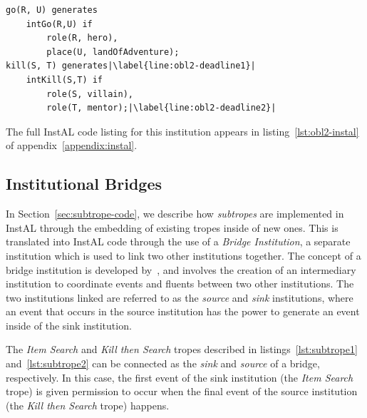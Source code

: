 \documentclass[11pt]{report}
\begin{document}
\begin{lstlisting}[label={lst:obl2-gen}, caption={Generation events for the
trope in Listing~\ref{lst:obl2-trope}}, escapechar=|]
go(R, U) generates
    intGo(R,U) if
        role(R, hero),
        place(U, landOfAdventure);
kill(S, T) generates|\label{line:obl2-deadline1}|
    intKill(S,T) if
        role(S, villain),
        role(T, mentor);|\label{line:obl2-deadline2}|
\end{lstlisting}

The full InstAL code listing for this institution appears in
listing~\ref{lst:obl2-instal} of appendix~\ref{appendix:instal}.


\subsection{Institutional Bridges}
\label{sec:bridges}

In Section~\ref{sec:subtrope-code}, we describe how \emph{subtropes} are
implemented in InstAL through the embedding of existing tropes inside of new
ones. This is translated into InstAL code through the use of a \emph{Bridge
  Institution}, a separate institution which is used to link two other
institutions together. The concept of a bridge institution is developed
by~\citet{bath45254}, and involves the creation of an intermediary institution to
coordinate events and fluents between two other institutions. The two institutions linked are referred to as the
\emph{source} and \emph{sink} institutions, where an event that occurs in the
source institution has the power to generate an event inside of the sink institution.

The \emph{Item Search} and \emph{Kill then Search} tropes
described in listings~\ref{lst:subtrope1} and~\ref{lst:subtrope2} can be
connected as the \emph{sink} and \emph{source} of a bridge,
respectively. In this case, the first event of the sink institution (the
\emph{Item Search} trope) is given permission to occur when the final event of
the source institution (the \emph{Kill then Search} trope) happens.
\end{document}
